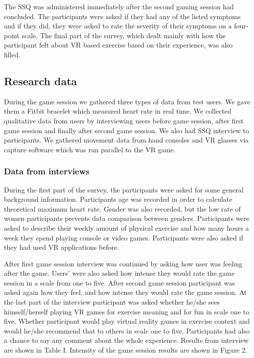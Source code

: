 \documentclass{sig-alternate-05-2015}
\begin{document}
The SSQ was administered immediately after the second gaming session had concluded. 
The participants were asked if they had any of the listed symptoms and if they did, 
they were asked to rate the severity of their symptoms on a four-point scale.  The 
final part of the survey, which dealt mainly with how the participant felt about VR 
based exercise based on their experience, was also filled. 

\subsection{Research data}
During the game session we gathered three types of data from test users. We gave 
them a Fitbit bracelet which measured heart rate in real time. We collected qualitative 
data from users by interviewing users before game session, after first game session and 
finally after second game session. We also had SSQ interview to participants. We gathered 
movement data from hand consoles and VR glasses via capture software which was run parallel 
to the VR game.

\subsubsection{Data from interviews}
During the first part of the survey, the participants were asked for some general background 
information. Participants age was recorded in order to calculate theoretical maximum 
heart rate. Gender was also recorded, but the low rate of women participants prevents data 
comparison between genders. Participants were asked to describe their weekly amount of physical 
exercise and how many hours a week they spend playing console or video games. Participants were 
also asked if they had used VR applications before. 

After first game session interview was continued by asking how user was feeling after the 
game. Users’ were also asked how intense they would rate the game session in a scale from 
one to five. After second game session participant was asked again how they feel, and 
how intense they would rate the game session. At the last part of the interview participant 
was asked whether he/she sees himself/herself playing VR games for exercise meaning and 
for fun in scale one to five. Whether participant would play virtual reality games in 
exercise context and would he/she recommend that to others in scale one to five. 
Participants had also a chance to say any comment about the whole experience. Results from 
interview are shown in Table I. Intensity of the game session results are shown in Figure 2.
\end{document}
